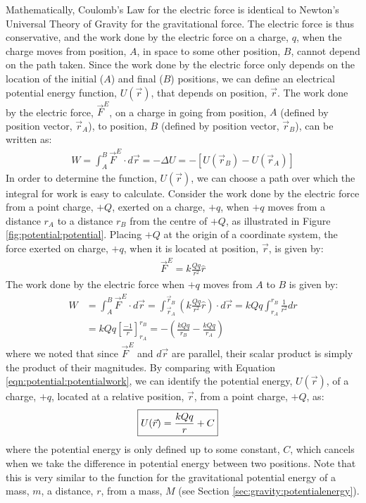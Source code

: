 Mathematically, Coulomb's Law for the electric force is identical to Newton's Universal Theory of Gravity for the gravitational force. The electric force is thus conservative, and the work done by the electric force on a charge, $q$, when the charge moves from position, $A$, in space to some other position, $B$, cannot depend on the path taken. Since the work done by the electric force only depends on the location of the initial ($A$) and final ($B$) positions, we can define an electrical potential energy function, $U(\vec r)$, that depends on position, $\vec r$. The work done by the electric force, $\vec F^E$,  on a charge in going from position, $A$ (defined by position vector, $\vec r_A$), to position, $B$ (defined by position vector, $\vec r_B$), can be written as:
\begin{align}
\label{eqn:potential:potentialwork}
W=\int_A^B \vec F^E\cdot d\vec r=-\Delta U=-\left[ U(\vec r_B)-U(\vec r_A) \right]
\end{align}
In order to determine the function, $U(\vec r)$, we can choose a path over which the integral for work is easy to calculate. Consider the work done by the electric force from a point charge, $+Q$, exerted on a charge, $+q$, when $+q$ moves from a distance $r_A$ to a distance $r_B$ from the centre of $+Q$, as illustrated in Figure \ref{fig:potential:potential}.
Placing $+Q$ at the origin of a coordinate system, the force exerted on charge, $+q$, when it is located at position, $\vec r$, is given by:
\begin{align*}
\vec F^E=k\frac{Qq}{r^2}\hat r
\end{align*}
The work done by the electric force when $+q$ moves from $A$ to $B$ is given by:
\begin{align*}
W&=\int_A^B \vec F^E\cdot d\vec r=\int_{\vec r_A}^{\vec r_B} \left(k\frac{Qq}{r^2}\hat r\right)\cdot d\vec r=kQq \int_{r_A}^{r_B} \frac{1}{r^2}dr\\
&=kQq \left[\frac{-1}{r} \right]_{r_A}^{r_B}=-\left(\frac{kQq}{r_B}-\frac{kQq}{r_A}\right)
\end{align*}
where we noted that since $\vec F^E$ and $d\vec r$ are parallel, their scalar product is simply the product of their magnitudes. By comparing with Equation \ref{eqn:potential:potentialwork}, we can identify the potential energy, $U(\vec r)$, of a charge, $+q$, located at a relative position, $\vec r$, from a point charge, $+Q$, as:
\begin{align*}
\Aboxed{U(\vec r)=\frac{kQq}{r}+C}
\end{align*}
where the potential energy is only defined up to some constant, $C$, which cancels when we take the difference in potential energy between two positions. Note that this is very similar to the function for the gravitational potential energy of a mass, $m$, a distance, $r$, from a mass, $M$ (see Section \ref{sec:gravity:potentialenergy}).

